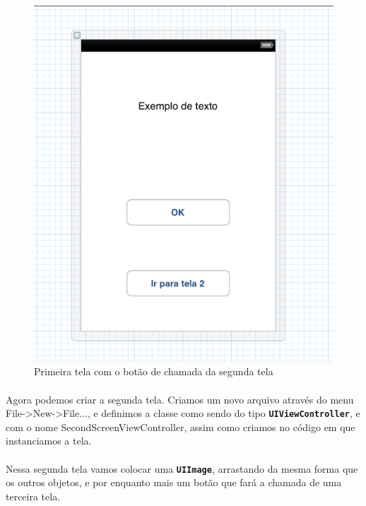 \documentclass[a4paper,12pt,brazil,doubleside]{book}
\begin{document}
\begin{figure}[h]
  \centering
  \includegraphics[totalheight=0.4\textheight]{figuras/1/simulador3_tela1.png}
  \caption{Primeira tela com o botão de chamada da segunda tela}
  \label{fig:a}
\end{figure}

\paragraph{}Agora podemos criar a segunda tela. Criamos um novo arquivo através do menu File->New->File..., e definimos a classe como sendo do tipo \texttt{\textbf{UIViewController}}, e com o nome SecondScreenViewController, assim como criamos no código em que instanciamos a tela.
\paragraph{}Nessa segunda tela vamos colocar uma \texttt{\textbf{UIImage}}, arrastando da mesma forma que os outros objetos, e por enquanto mais um botão que fará a chamada de uma terceira tela.

\pagebreak
\end{document}
